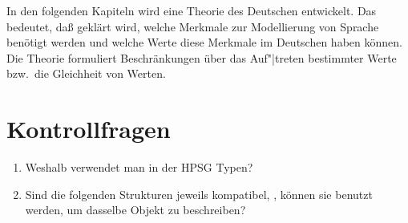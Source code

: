 In den folgenden Kapiteln wird eine Theorie des Deutschen entwickelt.
Das bedeutet, daß geklärt wird, welche Merkmale zur Modellierung
von Sprache benötigt werden und welche Werte diese Merkmale im Deutschen haben
können. Die Theorie formuliert Beschränkungen über das Auf"|treten
bestimmter Werte bzw.\ die Gleichheit von Werten.


\section*{Kontrollfragen}

\begin{enumerate}
\item Weshalb verwendet man in der HPSG Typen?
\item Sind die folgenden Strukturen jeweils kompatibel, \dash, können sie benutzt werden,
      um dasselbe Objekt zu beschreiben?
\ea
{}\hspace{0.5cm}
\z
\ea
{}\hspace{0.5cm}
\z


\end{enumerate}

